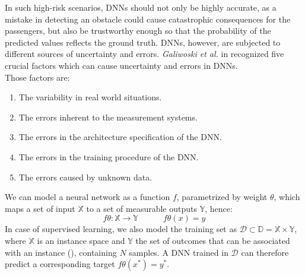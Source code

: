 In such high-risk scenarios, DNNs should not only be highly accurate, as a mistake in detecting an obstacle could cause catastrophic consequences for the passengers, but also be trustworthy enough so that the probability of the predicted values reflects the ground truth. DNNs, however, are subjected to different sources of uncertainty and errors. \textit{Galiwoski et al.} in \cite{gawlikowski2021survey} recognized five crucial factors which can cause uncertainty and errors in DNNs.\\
Those factors are:
\hfill
\begin{enumerate}[label=\Roman*.]
    \item The variability in real world situations. 
    \item The errors inherent to the measurement systems.
    \item The errors in the architecture specification of the DNN.
    \item The errors in the training procedure of the DNN.
    \item The errors caused by unknown data.
\end{enumerate}
We can model a neural network as a function $f$, parametrized by weight $\theta$, which maps a set of input $\mathbb{X}$ to a set of measurable outputs $\mathbb{Y}$, hence:
\begin{equation}
    f\theta : \mathbb{X} \rightarrow \mathbb{Y} \quad\quad\quad
    f\theta(x) = y
    \label{eq:DNN_model}
\end{equation}
In case of supervised learning, we also model the training set as $\mathcal{D} \subset \mathbb{D} = \mathbb{X} \times \mathbb{Y}$, where $\mathbb{X}$ is an instance space and $\mathbb{Y}$ the set of outcomes that can be associated with an instance (\cite{uncertainity_classi}), containing $N$ samples. A DNN trained in $\mathcal{D}$ can therefore predict a corresponding target $f\theta(x^*) = y^*$.\\
